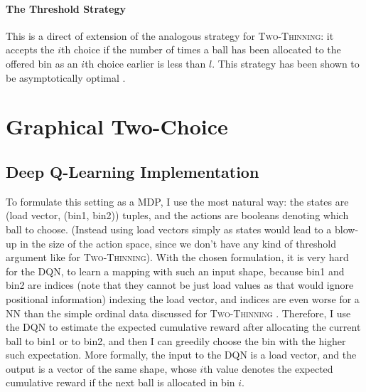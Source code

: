 \paragraph{The Threshold Strategy} This is a direct of extension of the analogous strategy for \textsc{Two-Thinning}: it accepts the $i$th choice if the number of times a ball has been allocated to the offered bin as an $i$th choice earlier is less than $l$. This strategy has been shown to be asymptotically optimal \cite{feldheim2020dthinning}.


\section{Graphical Two-Choice}



\subsection{Deep Q-Learning Implementation} \label{graphical-DQN}

To formulate this setting as a MDP, I use the most natural way: the states are (load vector, (bin1, bin2)) tuples, and the actions are booleans denoting which ball to choose. (Instead using load vectors simply as states would lead to a blow-up in the size of the action space, since we don't have any kind of threshold argument like for \textsc{Two-Thinning}). With the chosen formulation, it is very hard for the DQN, to learn a mapping with such an input shape, because bin1 and bin2 are indices (note that they cannot be just load values as that would ignore positional information) indexing the load vector, and indices are even worse for a NN than the simple ordinal data discussed for \textsc{Two-Thinning} . Therefore, I use the DQN to estimate the expected cumulative reward after allocating the current ball to bin1 or to bin2, and then I can greedily choose the bin with the higher such expectation. More formally, the input to the DQN is a load vector, and the output is a vector of the same shape, whose $i$th value denotes the expected cumulative reward if the next ball is allocated in bin $i$.  


